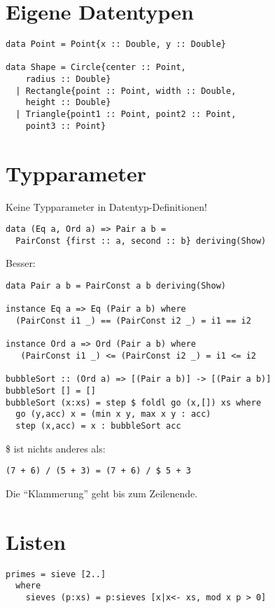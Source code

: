 \documentclass[
  10pt,                   %
  DIV12,
  german,                 %
  oneside,                %
  parskip=half,           %
  headings=normal,        %
  captions=tableheading,  %
]{scrartcl}
\begin{document}
\section{Eigene Datentypen}
\begin{lstlisting}
data Point = Point{x :: Double, y :: Double}

data Shape = Circle{center :: Point, 
    radius :: Double}
  | Rectangle{point :: Point, width :: Double, 
    height :: Double}
  | Triangle{point1 :: Point, point2 :: Point, 
    point3 :: Point}
\end{lstlisting}
\section{Typparameter}
Keine Typparameter in Datentyp-Definitionen!
\begin{lstlisting}
data (Eq a, Ord a) => Pair a b = 
  PairConst {first :: a, second :: b} deriving(Show)
\end{lstlisting}

Besser:
\begin{lstlisting}
data Pair a b = PairConst a b deriving(Show)

instance Eq a => Eq (Pair a b) where
  (PairConst i1 _) == (PairConst i2 _) = i1 == i2

instance Ord a => Ord (Pair a b) where
   (PairConst i1 _) <= (PairConst i2 _) = i1 <= i2

bubbleSort :: (Ord a) => [(Pair a b)] -> [(Pair a b)]
bubbleSort [] = []
bubbleSort (x:xs) = step $ foldl go (x,[]) xs where
  go (y,acc) x = (min x y, max x y : acc)
  step (x,acc) = x : bubbleSort acc
\end{lstlisting}

\$ ist nichts anderes als: 
\begin{lstlisting}
(7 + 6) / (5 + 3) = (7 + 6) / $ 5 + 3
\end{lstlisting}
Die "`Klammerung"' geht bis zum Zeilenende.
\section{Listen}
\begin{lstlisting}
primes = sieve [2..]
  where
    sieves (p:xs) = p:sieves [x|x<- xs, mod x p > 0]
\end{lstlisting}
\begin{center}
\scalebox{1}{}
\end{center}
\end{document}
